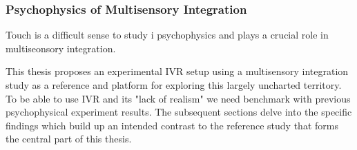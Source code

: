 \documentclass[12pt,oneside,openright]{report}
\begin{document}


\subsubsection*{Psychophysics of Multisensory Integration}


Touch is a difficult sense to study i psychophysics and plays a crucial role in multiseonsory integration. 

This thesis proposes an experimental IVR setup using a multisensory integration study as a reference and platform for exploring this largely uncharted territory. To be able to use IVR and its "lack of realism" we need benchmark with previous psychophysical experiment results. The subsequent sections delve into the specific findings which build up an intended contrast to the reference study that forms the central part of this thesis. 
\end{document}
